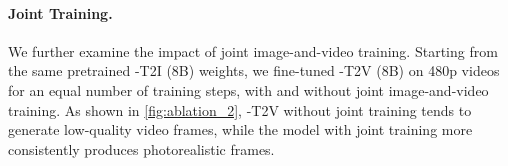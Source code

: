 \paragraph{Joint Training.} We further examine the impact of joint image-and-video training. Starting from the same pretrained \ours-T2I (8B) weights, we fine-tuned \ours-T2V (8B) on 480p videos for an equal number of training steps, with and without joint image-and-video training. As shown in \cref{fig:ablation_2}, \ours-T2V without joint training tends to generate low-quality video frames, while the model with joint training more consistently produces photorealistic frames.



